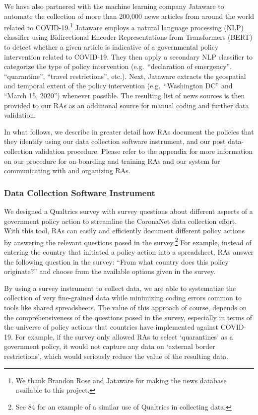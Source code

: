 \documentclass[]{article}
\let\rmarkdownfootnote\footnote%
\def\footnote{\protect\rmarkdownfootnote}
\begin{document}
We have also partnered with the machine learning company Jataware to automate the collection of more than 200,000 news articles from around the world related to COVID-19.\footnote{We thank Brandon Rose and Jataware for making the news database available to this project.} Jataware employs a natural language processing (NLP) classifier using Bidirectional Encoder Representations from Transformers (BERT) to detect whether a given article is indicative of a governmental policy intervention related to COVID-19. They then apply a secondary NLP classifier to categorize the type of policy intervention (e.g.~``declaration of emergency'', ``quarantine'', ``travel restrictions'', etc.). Next, Jataware extracts the geospatial and temporal extent of the policy intervention (e.g.~``Washington DC'' and ``March 15, 2020'') whenever possible. The resulting list of news sources is then provided to our RAs as an additional source for manual coding and further data validation.

In what follows, we describe in greater detail how RAs document the policies that they identify using our data collection software instrument, and our post data-collection validation procedure. Please refer to the appendix for more information on our procedure for on-boarding and training RAs and our system for communicating with and organizing RAs.

\hypertarget{data-collection-software-instrument}{%
\subsubsection*{Data Collection Software Instrument}\label{data-collection-software-instrument}}

We designed a Qualtrics survey with survey questions about different aspects of a government policy action to streamline the CoronaNet data collection effort. With this tool, RAs can easily and efficiently document different policy actions by answering the relevant questions posed in the survey.\footnote{See 84 for an example of a similar use of Qualtrics in collecting data.} For example, instead of entering the country that initiated a policy action into a spreadsheet, RAs answer the following question in the survey: ``From what country does this policy originate?'' and choose from the available options given in the survey.

By using a survey instrument to collect data, we are able to systematize the collection of very fine-grained data while minimizing coding errors common to tools like shared spreadsheets. The value of this approach of course, depends on the comprehensiveness of the questions posed in the survey, especially in terms of the universe of policy actions that countries have implemented against COVID-19. For example, if the survey only allowed RAs to select `quarantines' as a government policy, it would not capture any data on `external border restrictions', which would seriously reduce the value of the resulting data.
\end{document}
